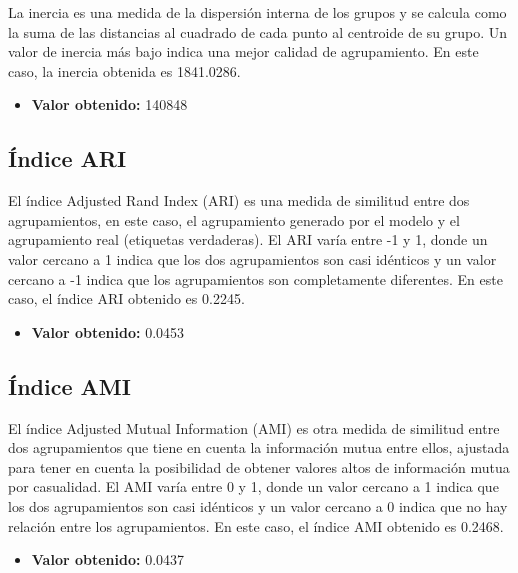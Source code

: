 \documentclass{wsdcr}
\begin{document}
La inercia es una medida de la dispersión interna de los grupos y se calcula como la suma de las distancias al cuadrado de cada punto al centroide de su grupo. Un valor de inercia más bajo indica una mejor calidad de agrupamiento. En este caso, la inercia obtenida es 1841.0286.

\begin{itemize}
    \item \textbf{Valor obtenido:} 140848
\end{itemize}

\subsection{Índice ARI}

El índice Adjusted Rand Index (ARI) es una medida de similitud entre dos agrupamientos, en este caso, el agrupamiento generado por el modelo y el agrupamiento real (etiquetas verdaderas). El ARI varía entre -1 y 1, donde un valor cercano a 1 indica que los dos agrupamientos son casi idénticos y un valor cercano a -1 indica que los agrupamientos son completamente diferentes. En este caso, el índice ARI obtenido es 0.2245.

\begin{itemize}
    \item \textbf{Valor obtenido:} 0.0453
\end{itemize}

\subsection{Índice AMI}

El índice Adjusted Mutual Information (AMI) es otra medida de similitud entre dos agrupamientos que tiene en cuenta la información mutua entre ellos, ajustada para tener en cuenta la posibilidad de obtener valores altos de información mutua por casualidad. El AMI varía entre 0 y 1, donde un valor cercano a 1 indica que los dos agrupamientos son casi idénticos y un valor cercano a 0 indica que no hay relación entre los agrupamientos. En este caso, el índice AMI obtenido es 0.2468.

\begin{itemize}
    \item \textbf{Valor obtenido:} 0.0437
\end{itemize}
\end{document}
